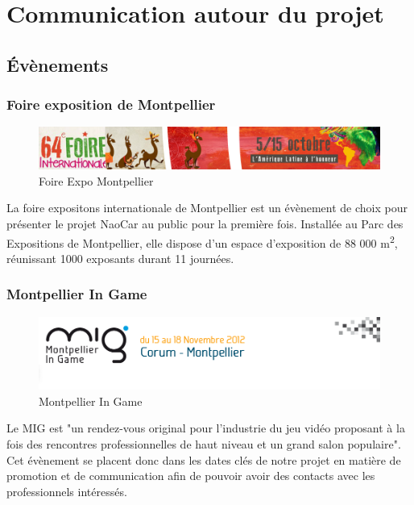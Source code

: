 \documentclass[11pt]{report} %
\begin{document}
	\section{Communication autour du projet}
		\subsection{Évènements}
			\subsubsection{Foire exposition de Montpellier}
				\begin{figure}[htb]
				\centering
				\includegraphics[width=1\textwidth]{foire-expo.png}
				\caption{Foire Expo Montpellier}
				\label{fig:Foire Expo Montpellier}
				\end{figure}
				La foire expositons internationale de Montpellier est un évènement de choix pour présenter le projet NaoCar au public pour la première fois. Installée au Parc des Expositions de Montpellier, elle dispose d'un espace d'exposition de 88 000 m\textsuperscript{2}, réunissant 1000 exposants durant 11 journées.
			\subsubsection{Montpellier In Game}
				\begin{figure}[htb]
				\centering
				\includegraphics[width=1\textwidth]{mig.png}
				\caption{Montpellier In Game}
				\label{fig:Montpellier In Game}
				\end{figure}
	                        Le MIG est "un rendez-vous original pour l’industrie du jeu vidéo proposant à la fois des rencontres professionnelles de haut niveau et un grand salon populaire". Cet évènement se placent donc dans les dates clés de notre projet en matière de promotion et de communication afin de pouvoir avoir des contacts avec les professionnels intéressés.
\end{document}
